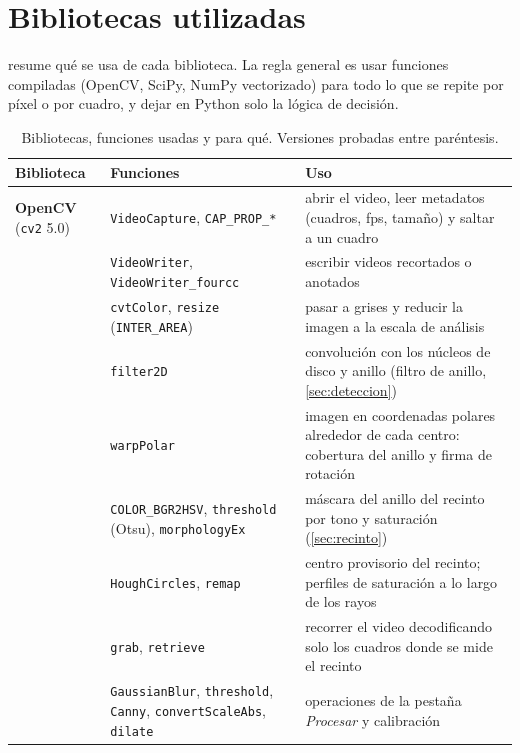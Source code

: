 \section{Bibliotecas utilizadas}\label{sec:librerias}

 resume qué se usa de cada biblioteca. La regla general es usar funciones
compiladas (OpenCV, SciPy, NumPy vectorizado) para todo lo que se repite por píxel o por cuadro, y
dejar en Python solo la lógica de decisión.

\begin{table}[H]
  \centering
  \caption{Bibliotecas, funciones usadas y para qué. Versiones probadas entre paréntesis.}
  \label{tab:librerias}
  \small
  \begin{tabular}{@{}p{2.4cm}p{5.6cm}p{6.6cm}@{}}
    \toprule
    Biblioteca & Funciones & Uso \\
    \midrule
    \textbf{OpenCV} \newline (\texttt{cv2} 5.0) &
      \texttt{VideoCapture}, \texttt{CAP\_PROP\_*} &
      abrir el video, leer metadatos (cuadros, fps, tamaño) y saltar a un cuadro \\
    & \texttt{VideoWriter}, \texttt{VideoWriter\_fourcc} & escribir videos recortados o anotados \\
    & \texttt{cvtColor}, \texttt{resize} (\texttt{INTER\_AREA}) & pasar a grises y reducir la imagen a la escala de análisis \\
    & \texttt{filter2D} & convolución con los núcleos de disco y anillo (filtro de anillo, \cref{sec:deteccion}) \\
    & \texttt{warpPolar} & imagen en coordenadas polares alrededor de cada centro: cobertura del anillo y firma de rotación \\
    & \texttt{COLOR\_BGR2HSV}, \texttt{threshold} (Otsu), \texttt{morphologyEx} & máscara del anillo del recinto por tono y saturación (\cref{sec:recinto}) \\
    & \texttt{HoughCircles}, \texttt{remap} & centro provisorio del recinto; perfiles de saturación a lo largo de los rayos \\
    & \texttt{grab}, \texttt{retrieve} & recorrer el video decodificando solo los cuadros donde se mide el recinto \\
    & \texttt{GaussianBlur}, \texttt{threshold}, \texttt{Canny}, \texttt{convertScaleAbs}, \texttt{dilate} & operaciones de la pestaña \emph{Procesar} y calibración \\

\end{tabular}
\end{table}
